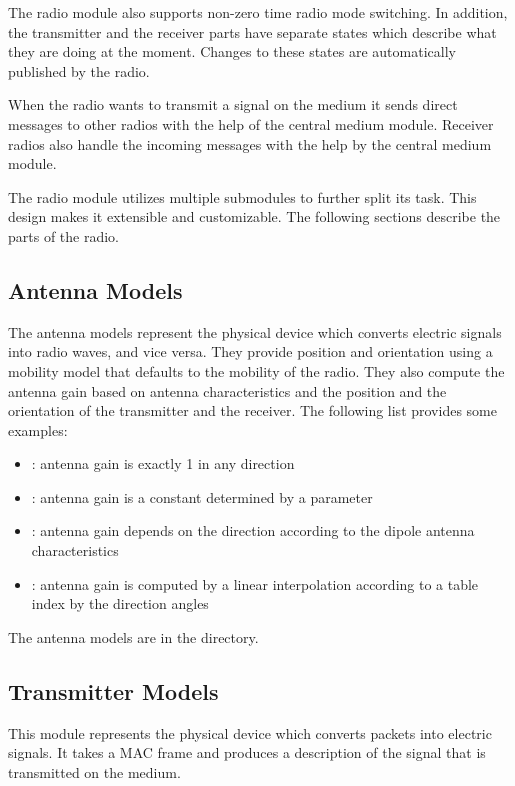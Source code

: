 The radio module also supports non-zero time radio mode switching. In addition,
the transmitter and the receiver parts have separate states which describe what
they are doing at the moment. Changes to these states are automatically published
by the radio.

When the radio wants to transmit a signal on the medium it sends direct messages
to other radios with the help of the central medium module. Receiver radios also
handle the incoming messages with the help by the central medium module.

The radio module utilizes multiple submodules to further split its task. This
design makes it extensible and customizable. The following sections describe the
parts of the radio.

\subsection{Antenna Models}

The antenna models represent the physical device which converts electric signals
into radio waves, and vice versa. They provide position and orientation using a
mobility model that defaults to the mobility of the radio. They also compute the
antenna gain based on antenna characteristics and the position and the orientation
of the transmitter and the receiver. The following list provides some examples:

\begin{itemize}
  \item {}: antenna gain is exactly 1 in any direction
  \item {}: antenna gain is a constant determined by
a parameter
  \item {}: antenna gain depends on the direction according
to the dipole antenna characteristics
  \item {}: antenna gain is computed by a linear
interpolation according to a table index by the direction angles
\end{itemize}

The antenna models are in the  directory.

\subsection{Transmitter Models}

This module represents the physical device which converts packets into electric
signals. It takes a MAC frame and produces a description of the signal that is
transmitted on the medium.

